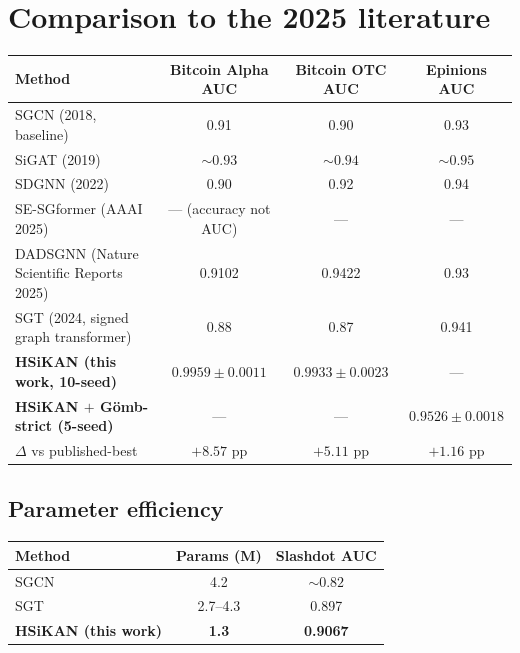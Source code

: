 \documentclass[11pt,a4paper]{article}
\theoremstyle{plain}
\theoremstyle{definition}
\begin{document}
\section{Comparison to the 2025 literature}

\begin{center}\footnotesize
\begin{tabular}{lccc}
\toprule
Method & Bitcoin Alpha AUC & Bitcoin OTC AUC & Epinions AUC \\
\midrule
SGCN (2018, baseline)               & 0.91 & 0.90 & 0.93 \\
SiGAT (2019)                        & ${\sim}0.93$ & ${\sim}0.94$ & ${\sim}0.95$ \\
SDGNN (2022)                        & 0.90 & 0.92 & 0.94 \\
SE-SGformer (AAAI 2025)             & --- (accuracy not AUC) & --- & --- \\
DADSGNN (Nature Scientific Reports 2025) & 0.9102 & 0.9422 & 0.93 \\
SGT (2024, signed graph transformer) & 0.88 & 0.87 & 0.941 \\
\midrule
\textbf{HSiKAN (this work, 10-seed)} & $\mathbf{0.9959 \pm 0.0011}$ & $\mathbf{0.9933 \pm 0.0023}$ & --- \\
\textbf{HSiKAN $+$ Gömb-strict (5-seed)} & --- & --- & $\mathbf{0.9526 \pm 0.0018}$ \\
$\Delta$ vs published-best          & $\mathbf{+8.57}$ pp & $\mathbf{+5.11}$ pp & $\mathbf{+1.16}$ pp \\
\bottomrule
\end{tabular}
\end{center}

\subsection{Parameter efficiency}

\begin{center}\footnotesize
\begin{tabular}{lcc}
\toprule
Method & Params (M) & Slashdot AUC \\
\midrule
SGCN              & 4.2 & ${\sim}0.82$ \\
SGT               & 2.7--4.3 & 0.897 \\
\textbf{HSiKAN (this work)} & \textbf{1.3} & \textbf{0.9067} \\
\bottomrule
\end{tabular}
\end{center}
\end{document}
